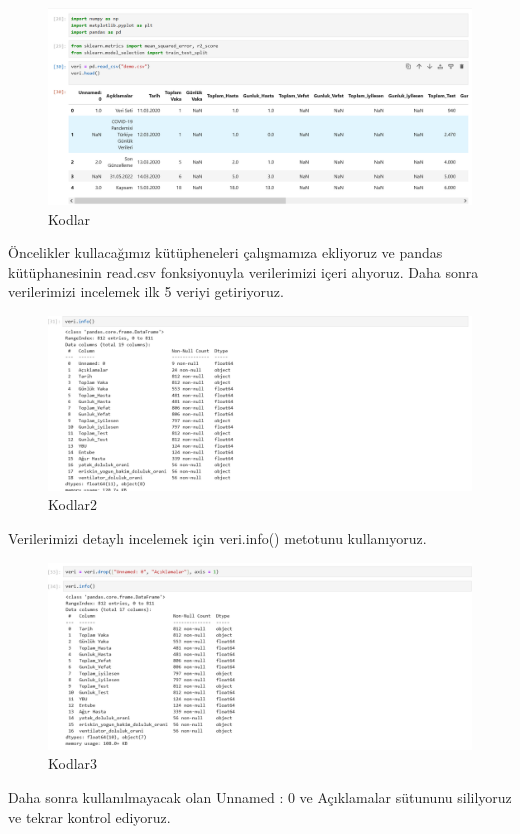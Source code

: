 \documentclass[12pt, a4paper]{article}
\begin{document}
	\begin{figure}[!htbp] 
		\caption{Kodlar}
		\centering
		\includegraphics[angle=0, width=\textwidth]{5.0.png}
		
	\end{figure} 
	
	Öncelikler kullacağımız kütüpheneleri çalışmamıza ekliyoruz ve pandas kütüphanesinin read.csv fonksiyonuyla verilerimizi içeri alıyoruz.\newline
	Daha sonra verilerimizi incelemek ilk 5 veriyi getiriyoruz.
	
	\begin{figure}[!htbp] 
		\caption{Kodlar2}
		\centering
		\includegraphics[angle=0, width=\textwidth]{6.0.png} 
		
	\end{figure} 
	\newpage
	Verilerimizi detaylı incelemek için veri.info() metotunu kullanıyoruz.
	
	\begin{figure}[!htbp] 
		\caption{Kodlar3}
		\centering
		\includegraphics[angle=0, width=\textwidth]{7.0.png} 
		
	\end{figure}
	Daha sonra kullanılmayacak olan Unnamed : 0 ve Açıklamalar sütununu sililyoruz ve tekrar kontrol ediyoruz.
	
\end{document}
